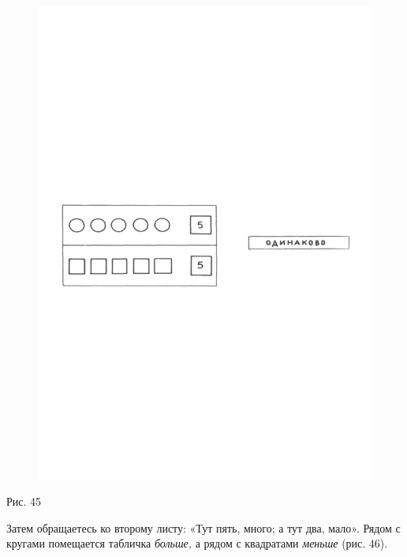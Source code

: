 \documentclass[a5paper]{book}
\renewcommand{\emph}[1]{\textit{#1}}
\begin{document}
\begin{figure}
\centering
\includegraphics[width=\linewidth]{media/media/image41.png}
\end{figure}

Рис. 45

Затем обращаетесь ко второму листу: «Тут пять, много; а тут два, мало».
Рядом с кругами помещается табличка \emph{больше,} а рядом с квадратами
\emph{меньше} (рис. 46).
\end{document}
